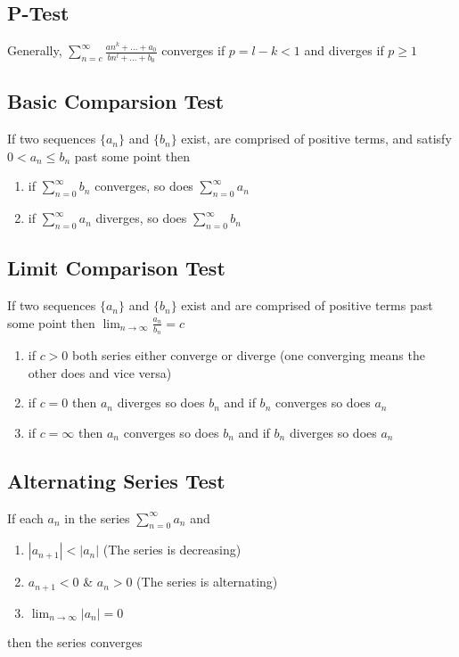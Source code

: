 \documentclass[10pt,landscape,letterpaper]{cheatsheet}
\begin{document}
\subsection*{P-Test}
Generally, $\sum_{n=c}^{\infty}\frac{an^k+\dots+a_0}{bn^l+\dots+b_0}$ converges if $p=l-k<1$ and diverges if $p\geq 1$
\subsection*{Basic Comparsion Test}
If two sequences $\{a_n\}$ and $\{b_n\}$ exist, are comprised of positive terms, and satisfy $0<a_n\leq b_n$
past some point then
\begin{enumerate}[label=(\alph*)]
        \item if $\sum_{n=0}^{\infty}b_n$ converges, so does $\sum_{n=0}^{\infty}a_n$
        \item if $\sum_{n=0}^{\infty}a_n$ diverges, so does $\sum_{n=0}^{\infty}b_n$
\end{enumerate}
\subsection*{Limit Comparison Test}
If two sequences $\{a_n\}$ and $\{b_n\}$ exist and are comprised of positive terms past some point then
$\lim_{n \to \infty} \frac{a_n}{b_n} =c$
\begin{enumerate}[label=(\alph*)]
        \item if $c>0$ both series either converge or diverge (one converging means the other does and vice versa)
        \item if $c=0$ then $a_n$ diverges so does $b_n$ and if $b_n$ converges so does $a_n$
        \item if $c=\infty$ then $a_n$ converges so does $b_n$ and if $b_n$ diverges so does $a_n$
\end{enumerate}
\subsection*{Alternating Series Test}
If each $a_n$ in the series $\sum_{n=0}^{\infty}a_n$ and
\begin{enumerate}[label=(\arabic*)]
        \item $|a_{n+1}|<|a_n|$ (The series is decreasing)
        \item $a_{n+1}<0$ \& $a_n>0$ (The series is alternating)
        \item $\lim_{n \to \infty} |a_n|=0$
\end{enumerate}
then the series converges
\end{document}

